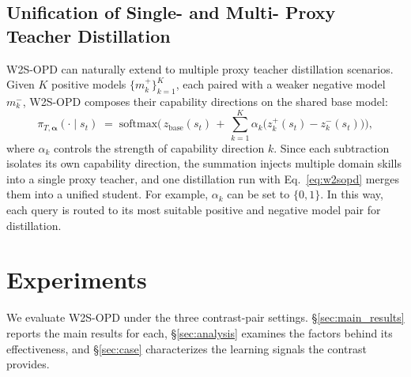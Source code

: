 \documentclass{article}
\newcommand\ours{W2S-OPD\xspace}
\begin{document}
\subsection{Unification of Single- and Multi- Proxy Teacher Distillation}
\label{sec:multi_synthesis}
\ours can naturally extend to multiple proxy teacher distillation scenarios. Given $K$ positive models $\{m^{+}_k\}_{k=1}^{K}$, each paired with a weaker negative model $m^{-}_k$, \ours composes their capability directions on the shared base model:
\begin{equation}
\label{eq:multi}
\pi_{T,\boldsymbol{\alpha}}(\cdot \mid s_t) \;=\; \mathrm{softmax}\Big(\, z_{\mathrm{base}}(s_t) \,+\, \sum_{k=1}^{K} \alpha_k \big( z^{+}_k(s_t) - z^{-}_k(s_t) \big) \Big),
\end{equation}
where $\alpha_k$ controls the strength of capability direction $k$. Since each subtraction isolates its own capability direction, the summation injects multiple domain skills into a single proxy teacher, and one distillation run with Eq.~\ref{eq:w2sopd} merges them into a unified student. For example, $\alpha_k$ can be set to $\{0, 1\}$. In this way, each query is routed to its most suitable positive and negative model pair for distillation. 

\begin{table}[t]
\centering
\caption{The three instantiations of the contrast pair in \ours. All models are from Qwen3 series.}
\vspace{5pt}
\vspace{-10pt}
\label{tab:instantiations}
\end{table}
\section{Experiments}
We evaluate \ours under the three contrast-pair settings. \S\ref{sec:main_results} reports the main results for each, \S\ref{sec:analysis} examines
the factors behind its effectiveness, and \S\ref{sec:case} characterizes the learning signals the contrast provides.
\end{document}
